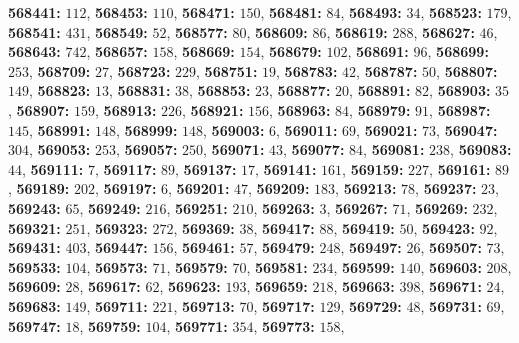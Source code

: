 \textsf{\bfseries 568441:} $112$, \textsf{\bfseries 568453:} $110$, \textsf{\bfseries 568471:} $150$, \textsf{\bfseries 568481:} $84$, \textsf{\bfseries 568493:} $34$, \textsf{\bfseries 568523:} $179$, \textsf{\bfseries 568541:} $431$, \textsf{\bfseries 568549:} $52$, \textsf{\bfseries 568577:} $80$, \textsf{\bfseries 568609:} $86$, \textsf{\bfseries 568619:} $288$, \textsf{\bfseries 568627:} $46$, \textsf{\bfseries 568643:} $742$, \textsf{\bfseries 568657:} $158$, \textsf{\bfseries 568669:} $154$, \textsf{\bfseries 568679:} $102$, \textsf{\bfseries 568691:} $96$, \textsf{\bfseries 568699:} $253$, \textsf{\bfseries 568709:} $27$, \textsf{\bfseries 568723:} $229$, \textsf{\bfseries 568751:} $19$, \textsf{\bfseries 568783:} $42$, \textsf{\bfseries 568787:} $50$, \textsf{\bfseries 568807:} $149$, \textsf{\bfseries 568823:} $13$, \textsf{\bfseries 568831:} $38$, \textsf{\bfseries 568853:} $23$, \textsf{\bfseries 568877:} $20$, \textsf{\bfseries 568891:} $82$, \textsf{\bfseries 568903:} $35$, \textsf{\bfseries 568907:} $159$, \textsf{\bfseries 568913:} $226$, \textsf{\bfseries 568921:} $156$, \textsf{\bfseries 568963:} $84$, \textsf{\bfseries 568979:} $91$, \textsf{\bfseries 568987:} $145$, \textsf{\bfseries 568991:} $148$, \textsf{\bfseries 568999:} $148$, \textsf{\bfseries 569003:} $6$, \textsf{\bfseries 569011:} $69$, \textsf{\bfseries 569021:} $73$, \textsf{\bfseries 569047:} $304$, \textsf{\bfseries 569053:} $253$, \textsf{\bfseries 569057:} $250$, \textsf{\bfseries 569071:} $43$, \textsf{\bfseries 569077:} $84$, \textsf{\bfseries 569081:} $238$, \textsf{\bfseries 569083:} $44$, \textsf{\bfseries 569111:} $7$, \textsf{\bfseries 569117:} $89$, \textsf{\bfseries 569137:} $17$, \textsf{\bfseries 569141:} $161$, \textsf{\bfseries 569159:} $227$, \textsf{\bfseries 569161:} $89$, \textsf{\bfseries 569189:} $202$, \textsf{\bfseries 569197:} $6$, \textsf{\bfseries 569201:} $47$, \textsf{\bfseries 569209:} $183$, \textsf{\bfseries 569213:} $78$, \textsf{\bfseries 569237:} $23$, \textsf{\bfseries 569243:} $65$, \textsf{\bfseries 569249:} $216$, \textsf{\bfseries 569251:} $210$, \textsf{\bfseries 569263:} $3$, \textsf{\bfseries 569267:} $71$, \textsf{\bfseries 569269:} $232$, \textsf{\bfseries 569321:} $251$, \textsf{\bfseries 569323:} $272$, \textsf{\bfseries 569369:} $38$, \textsf{\bfseries 569417:} $88$, \textsf{\bfseries 569419:} $50$, \textsf{\bfseries 569423:} $92$, \textsf{\bfseries 569431:} $403$, \textsf{\bfseries 569447:} $156$, \textsf{\bfseries 569461:} $57$, \textsf{\bfseries 569479:} $248$, \textsf{\bfseries 569497:} $26$, \textsf{\bfseries 569507:} $73$, \textsf{\bfseries 569533:} $104$, \textsf{\bfseries 569573:} $71$, \textsf{\bfseries 569579:} $70$, \textsf{\bfseries 569581:} $234$, \textsf{\bfseries 569599:} $140$, \textsf{\bfseries 569603:} $208$, \textsf{\bfseries 569609:} $28$, \textsf{\bfseries 569617:} $62$, \textsf{\bfseries 569623:} $193$, \textsf{\bfseries 569659:} $218$, \textsf{\bfseries 569663:} $398$, \textsf{\bfseries 569671:} $24$, \textsf{\bfseries 569683:} $149$, \textsf{\bfseries 569711:} $221$, \textsf{\bfseries 569713:} $70$, \textsf{\bfseries 569717:} $129$, \textsf{\bfseries 569729:} $48$, \textsf{\bfseries 569731:} $69$, \textsf{\bfseries 569747:} $18$, \textsf{\bfseries 569759:} $104$, \textsf{\bfseries 569771:} $354$, \textsf{\bfseries 569773:} $158$, 
